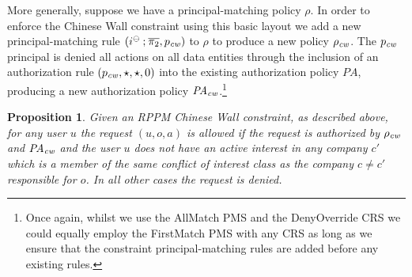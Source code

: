 \documentclass{article}
\newtheorem{proposition}{Proposition}
\newcommand{\comp}{\mathbin{;}}
\newcommand{\interestb}{\ensuremath{i^\ominus}}
\newcommand{\pa}{\mathit{PA}}
\begin{document}
More generally, suppose we have a principal-matching policy $\rho$.
In order to enforce the Chinese Wall constraint using this basic layout we add a new principal-matching rule $(\interestb \comp \overline{\pi_2}, p_{\it cw})$ to $\rho$ to produce a new policy $\rho_{\it cw}$.
The $p_{\it cw}$ principal is denied all actions on all data entities through the inclusion of an authorization rule $(p_{\it cw}, \star, \star, 0)$ into the existing authorization policy $\pa$, producing a new authorization policy $\pa_{\it cw}$.\footnote{Once again, whilst we use the \textsf{AllMatch} PMS and the \textsf{DenyOverride} CRS we could equally employ the \textsf{FirstMatch} PMS with any CRS as long as we ensure that the constraint principal-matching rules are added before any existing rules.}

\begin{proposition}\label{prop:chinese-wall}
    Given an RPPM Chinese Wall constraint, as described above, for any user $u$ the request $(u,o,a)$ is allowed if the request is authorized by $\rho_{\it cw}$ and $\pa_{\it cw}$ and the user $u$ does not have an active interest in any company $c'$ which is a member of the same conflict of interest class as the company $c \neq c'$ responsible for $o$.
    In all other cases the request is denied.
\end{proposition}
\end{document}

